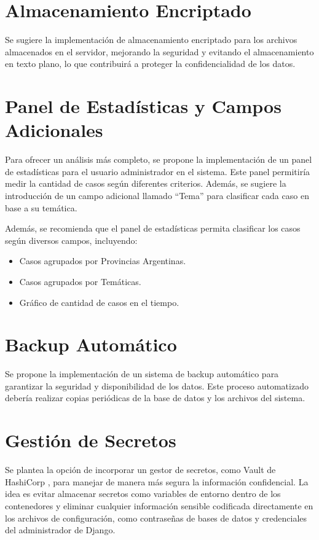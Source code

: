 \section{Almacenamiento Encriptado}

Se sugiere la implementación de almacenamiento encriptado para los archivos almacenados en el servidor, mejorando la seguridad y evitando el almacenamiento en texto plano, lo que contribuirá a proteger la confidencialidad de los datos.

\section{Panel de Estadísticas y Campos Adicionales}

Para ofrecer un análisis más completo, se propone la implementación de un panel de estadísticas para el usuario administrador en el sistema. Este panel permitiría medir la cantidad de casos según diferentes criterios. Además, se sugiere la introducción de un campo adicional llamado ``Tema'' para clasificar cada caso en base a su temática.

Además, se recomienda que el panel de estadísticas permita clasificar los casos según diversos campos, incluyendo:
\begin{itemize}
\item Casos agrupados por Provincias Argentinas.
\item Casos agrupados por Temáticas.
\item Gráfico de cantidad de casos en el tiempo.
\end{itemize}

\section{Backup Automático}
Se propone la implementación de un sistema de backup automático para garantizar la seguridad y disponibilidad de los datos. Este proceso automatizado debería realizar copias periódicas de la base de datos y los archivos del sistema.

\section{Gestión de Secretos}

Se plantea la opción de incorporar un gestor de secretos, como Vault de HashiCorp \cite{voult}, para manejar de manera más segura la información confidencial. La idea es evitar almacenar secretos como variables de entorno dentro de los contenedores y eliminar cualquier información sensible codificada directamente en los archivos de configuración, como contraseñas de bases de datos y credenciales del administrador de Django.
